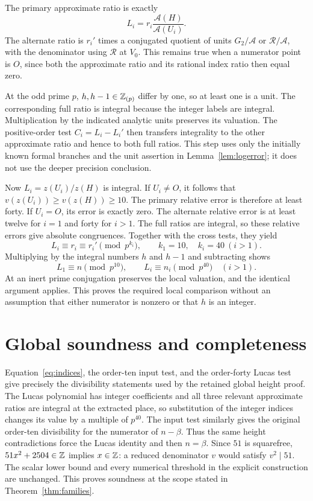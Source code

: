 \documentclass[11pt,a4paper]{article}
\theoremstyle{remark}\newtheorem{remark}[theorem]{Remark}
\begin{document}
The primary approximate ratio is exactly
\[
 L_i=r_i\frac{\mathcal A(H)}{\mathcal A(U_i)}.
\]
The alternate ratio is $r_i'$ times a conjugated quotient of units
$G_2/\mathcal A$ or $\mathcal R/\mathcal A$, with the denominator
using $\mathcal R$ at $V_0$. This remains true when a numerator point
is $O$, since both the approximate ratio and its rational index ratio
then equal zero.

At the odd prime $p$, $h,h-1\in\mathbb Z_{(p)}$ differ by one, so at least
one is a unit. The corresponding full ratio is integral because the
integer labels are integral. Multiplication by the indicated analytic
units preserves its valuation. The positive-order test $C_i=L_i-L_i'$
then transfers integrality to the other approximate ratio and hence
to both full ratios. This step uses only the initially known formal
branches and the unit assertion in Lemma~\ref{lem:logerror}; it does
not use the deeper precision conclusion.

Now $L_i=z(U_i)/z(H)$ is integral. If $U_i\ne O$, it follows that
$v(z(U_i))\ge v(z(H))\ge10$. The primary relative error is therefore
at least forty. If $U_i=O$, its error is exactly zero. The alternate
relative error is at least twelve for $i=1$ and forty for $i>1$.
The full ratios are integral, so these relative errors give absolute
congruences. Together with the cross tests, they yield
\[
 L_i\equiv r_i\equiv r_i'\pmod{p^{k_i}},
 \qquad k_1=10,\quad k_i=40\ (i>1).
\]
Multiplying by the integral numbers $h$ and $h-1$ and subtracting
shows
\begin{equation}\label{eq:indices}
           L_1\equiv n\pmod{p^{10}},\qquad
           L_i\equiv n_i\pmod{p^{40}}\quad(i>1).
\end{equation}
At an inert prime conjugation preserves the local valuation, and
the identical argument applies. This proves the required local
comparison without an assumption that either numerator is nonzero
or that $h$ is an integer.

\section{Global soundness and completeness}
Equation~\eqref{eq:indices}, the order-ten input test, and the
order-forty Lucas test give precisely the divisibility statements
used by the retained global height proof. The Lucas polynomial has
integer coefficients and all three relevant approximate ratios are
integral at the extracted place, so substitution of the integer
indices changes its value by a multiple of $p^{40}$. The input test
similarly gives the original order-ten divisibility for the numerator
of $n-\beta$. Thus the same height contradictions force the Lucas
identity and then $n=\beta$. Since $51$ is squarefree,
$51x^2+2504\in\mathbb Z$ implies $x\in\mathbb Z$: a reduced denominator $v$ would
satisfy $v^2\mid51$. The scalar lower bound and every numerical
threshold in the explicit construction are unchanged. This proves soundness at the scope stated in
Theorem~\ref{thm:families}.
\end{document}
